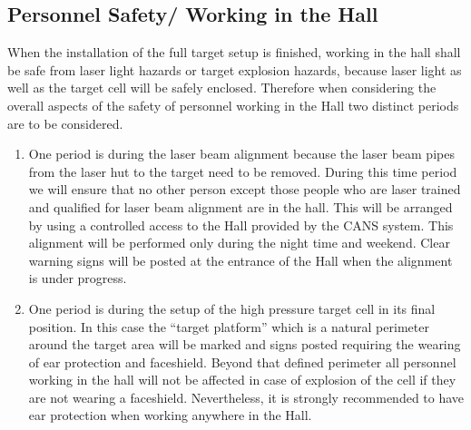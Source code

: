 \begin{safetyen}{10}{5}
\subsection{Personnel Safety/ Working in the Hall}
\label{sec:prs}

When the installation of the full target setup is finished, working in
the hall
shall be safe from laser light hazards or target explosion hazards,
because 
laser light as  well as the target cell will be safely enclosed.
Therefore 
when considering the overall aspects of the safety of personnel working
in the
Hall two distinct periods are to be considered.

\begin{enumerate}

\item One period is during the laser beam alignment because the laser
beam pipes
from the laser hut to the  target need to be removed. During this time
period we
will ensure that no other person except those people who are laser
trained and qualified  for
laser beam alignment are in the hall. This will be arranged by using a
controlled access 
to the Hall provided by the CANS system.
This alignment 
will be performed only during the night time and weekend. 
Clear warning signs will
be posted  at the
entrance of the Hall when the alignment is under progress.

\item One period is during the setup of the high pressure target cell in
its final position. 
In this case the ``target platform'' which is a natural perimeter around
the target area 
 will be marked  and signs posted requiring the wearing of ear
protection and
faceshield. Beyond that defined perimeter all personnel working in the
hall
will not be affected in case of explosion of the cell if they are not 
wearing  a faceshield. Nevertheless, it is strongly recommended to have 
ear protection when working anywhere in the Hall. 
\end{enumerate}
\end{safetyen}

